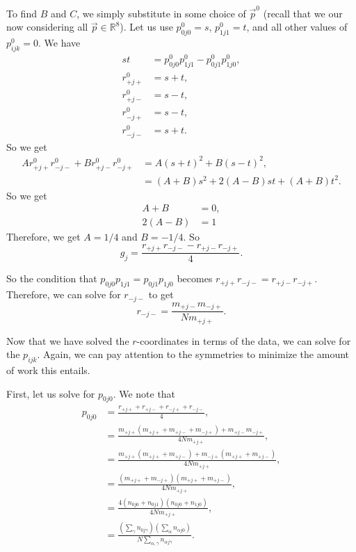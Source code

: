 To find \(B\) and \(C\), we simply substitute in some choice of \(\vec p^0\) (recall that we our now considering
all \(\vec p\in\mathbb R^8\)). Let us use \(p^0_{0j0} = s\), \(p^0_{1j1} = t\), and all other 
values of \(p^0_{ijk} = 0\). We have
\begin{align}
st & = p^0_{0j0}p^0_{1j1} - p^0_{0j1} p^0_{1j0}, \\
r^0_{+j+} & = s + t, \\
r^0_{+j-} & = s - t, \\
r^0_{-j+} & = s - t, \\
r^0_{-j-} & = s + t.
\end{align}
So we get
\begin{align}
Ar^0_{+j+}r^0_{-j-} + Br^0_{+j-}r^0_{-j+} & = A(s + t)^2 + B(s - t)^2, \\
& = (A + B)s^2 + 2(A - B)st + (A + B)t^2. 
\end{align}
So we get
\begin{align}
A + B & = 0, \\
2(A - B) & = 1
\end{align}
Therefore, we get \(A = 1/4\) and \(B = -1/4\). So
\begin{equation}
g_j = \frac{r_{+j+}r_{-j-} - r_{+j-}r_{-j+} } {4}.
\end{equation}

So the condition that \(p_{0j0}p_{1j1} = p_{0j1} p_{1j0}\) becomes 
\(r_{+j+} r_{-j-} = r_{+j-} r_{-j+} \). Therefore, we can solve for \(r_{-j-}\) to
get
\begin{equation}
r_{-j-} = \frac{m_{+j-} m_{-j+} }{N m_{+j+} }.
\end{equation}

Now that we have solved the \(r\)-coordinates in terms of the data, we can solve
for the \(p_{ijk}\). Again, we can pay attention to the symmetries to minimize the
amount of work this entails.

First, let us solve for \(p_{0j0}\). We note that
\begin{align}
p_{0j0} & = \frac{r_{+j+} + r_{+j-} + r_{-j+} + r_{-j-} } {4}, \\
& = \frac{m_{+j+}( m_{+j+} + m_{+j-} + m_{-j+}) + m_{+j-}m_{-j+}} {4Nm_{+j+}}, \\
& = \frac{m_{+j+}( m_{+j+} + m_{+j-}) + m_{-j+}(m_{+j+} + m_{+j-}) } {4Nm_{+j+}}, \\
& = \frac{(m_{+j+} + m_{-j+}) (m_{+j+} + m_{+j-}) } {4Nm_{+j+}}, \\
& = \frac{4(n_{0j0} + n_{0j1})(n_{0j0} + n_{1j0}) } {4Nm_{+j+}}, \\
& = \frac{\left(\sum_\gamma n_{0j\gamma}\right) \left(\sum_\alpha n_{\alpha j0}\right) } 
    {N\sum_{\alpha, \gamma} n_{\alpha j\gamma}}.
\end{align}


